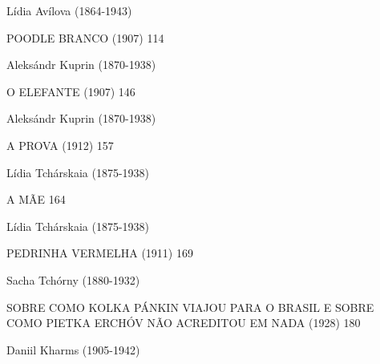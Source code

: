 Lídia Avílova (1864-1943)

POODLE BRANCO (1907) 114

Aleksándr Kuprin (1870-1938)

O ELEFANTE (1907) 146

Aleksándr Kuprin (1870-1938)

A PROVA (1912) 157

Lídia Tchárskaia (1875-1938)

A MÃE 164

Lídia Tchárskaia (1875-1938)

PEDRINHA VERMELHA (1911) 169

Sacha Tchórny (1880-1932)

SOBRE COMO KOLKA PÁNKIN VIAJOU PARA O BRASIL E SOBRE COMO PIETKA ERCHÓV
NÃO ACREDITOU EM NADA (1928) 180

Daniil Kharms (1905-1942)